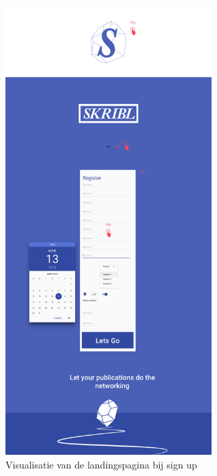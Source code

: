 \documentclass{article}
\begin{document}
\begin{appendices}
\begin{figure}[!h]
\centering
 \includegraphics[width=80mm]{pieteruploads/SKRBL_FRNT_Homeaftersignup.png}
 \caption{Visualisatie van de landingspagina bij sign up}
\end{figure}
\clearpage



\end{appendices}
\end{document}
